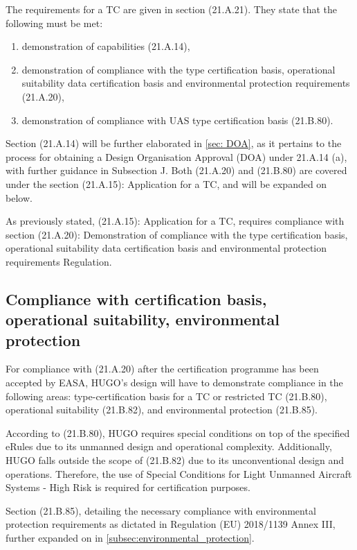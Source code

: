 The requirements for a TC are given in section (21.A.21). They state that the following must be met:

\begin{enumerate}
    \item demonstration of capabilities (21.A.14),
    \item demonstration of compliance with the type certification basis, operational suitability data certification basis and environmental protection requirements (21.A.20),
    \item demonstration of compliance with UAS type certification basis (21.B.80). 
\end{enumerate}

Section (21.A.14) will be further elaborated in \autoref{sec: DOA}, as it pertains to the process for obtaining a Design Organisation Approval (DOA) under 21.A.14 (a), with further guidance in Subsection J. Both (21.A.20) and (21.B.80) are covered under the section (21.A.15): Application for a TC, and will be expanded on below.

As previously stated, (21.A.15): Application for a TC, requires compliance with section (21.A.20): Demonstration of compliance with the type certification basis, operational suitability data certification basis and environmental protection requirements Regulation. 

\subsection{Compliance with certification basis, operational suitability, environmental protection}
\label{sec:CS-23 and SC-UAS}

For compliance with (21.A.20) after the certification programme has been accepted by EASA, HUGO's design will have to demonstrate compliance in the following areas: type-certification basis for a TC or restricted TC (21.B.80), operational suitability (21.B.82), and environmental protection (21.B.85).

According to (21.B.80), HUGO requires special conditions on top of the specified eRules due to its unmanned design and operational complexity. Additionally, HUGO falls outside the scope of (21.B.82) due to its unconventional design and operations. Therefore, the use of Special Conditions for Light Unmanned Aircraft Systems - High Risk \cite{easa_light_uas_crd_is3} is required for certification purposes.

Section (21.B.85), detailing the necessary compliance with environmental protection requirements as dictated in Regulation (EU) 2018/1139 Annex III, further expanded on in \autoref{subsec:environmental_protection}. 

